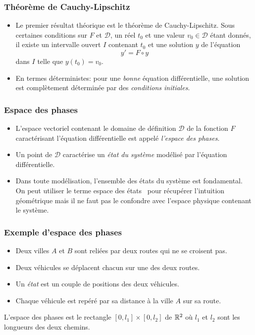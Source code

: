 \begin{frame}
  \frametitle{Théorème de Cauchy-Lipschitz}
\begin{itemize}
  \item Le premier résultat théorique est le théorème de Cauchy-Lipschitz.\newline
  Sous certaines conditions sur $F$ et $\mathcal{D}$, un réel $t_0$ et une valeur $v_0\in \mathcal{D}$ étant donnés, il existe un intervalle ouvert $I$ contenant $t_0$ et une solution $y$ de l'équation
\begin{equation*}
  y' = F\circ y
\end{equation*}  
dans $I$ telle que $y(t_0)=v_0$.
  \item  En termes déterministes: pour une \emph{bonne} équation différentielle, une solution est complètement déterminée par des \emph{conditions initiales}.
\end{itemize}
\end{frame}

\begin{frame}
  \frametitle{Espace des phases}
\begin{itemize}
  \item L'espace vectoriel contenant le domaine de définition $\mathcal{D}$ de la fonction $F$ caractérisant l'équation différentielle est appelé \emph{l'espace des phases}.
  \item Un point de $\mathcal{D}$ caractérise un \emph{état du système} modélisé par l'équation différentielle.
  \item Dans toute modélisation, l'ensemble des états du système est fondamental. On peut utiliser le terme \og espace des états\fg ~ pour récupérer l'intuition géométrique mais il ne faut pas le confondre avec l'espace physique contenant le système.
\end{itemize}
\end{frame}

\begin{frame}
  \frametitle{Exemple d'espace des phases}
\begin{itemize}
  \item Deux villes $A$ et $B$ sont reliées par deux routes qui ne se croisent pas. 
  \item Deux véhicules se déplacent chacun sur une des deux routes.
  \item Un \emph{état} est un couple de positions des deux véhicules.
  \item Chaque véhicule est repéré par sa distance à la ville $A$ sur sa route.
\end{itemize}
 L'espace des phases est le rectangle $[0,l_1]\times[0,l_2]$ de $\mathbb{R}^2$ où $l_1$ et $l_2$ sont les longueurs des deux chemins.
\end{frame}

